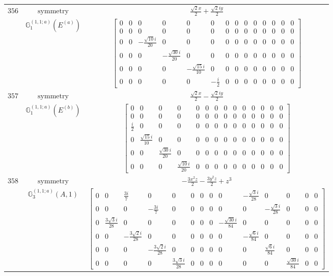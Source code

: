 \documentclass[fleqn,8pt,landscape]{jsarticle}
\begin{document}
\begin{longtable}{ccc}
$ 356 $ & $ \text{symmetry} $ & $ \frac{\sqrt{2} x}{2} + \frac{\sqrt{2} i y}{2} $ \\
$  $ & $ \mathbb{G}_{1}^{(1,1;a)}(E^{(a)}) $ & $ \begin{bmatrix} 0 & 0 & 0 & 0 & 0 & 0 & 0 & 0 & 0 & 0 & 0 & 0 & 0 & 0 \\ 0 & 0 & 0 & 0 & 0 & 0 & 0 & 0 & 0 & 0 & 0 & 0 & 0 & 0 \\ 0 & 0 & - \frac{\sqrt{10} i}{20} & 0 & 0 & 0 & 0 & 0 & 0 & 0 & 0 & 0 & 0 & 0 \\ 0 & 0 & 0 & - \frac{\sqrt{30} i}{20} & 0 & 0 & 0 & 0 & 0 & 0 & 0 & 0 & 0 & 0 \\ 0 & 0 & 0 & 0 & - \frac{\sqrt{15} i}{10} & 0 & 0 & 0 & 0 & 0 & 0 & 0 & 0 & 0 \\ 0 & 0 & 0 & 0 & 0 & - \frac{i}{2} & 0 & 0 & 0 & 0 & 0 & 0 & 0 & 0 \end{bmatrix} $ \\ \hline
$ 357 $ & $ \text{symmetry} $ & $ \frac{\sqrt{2} x}{2} - \frac{\sqrt{2} i y}{2} $ \\
$  $ & $ \mathbb{G}_{1}^{(1,1;a)}(E^{(b)}) $ & $ \begin{bmatrix} 0 & 0 & 0 & 0 & 0 & 0 & 0 & 0 & 0 & 0 & 0 & 0 & 0 & 0 \\ 0 & 0 & 0 & 0 & 0 & 0 & 0 & 0 & 0 & 0 & 0 & 0 & 0 & 0 \\ \frac{i}{2} & 0 & 0 & 0 & 0 & 0 & 0 & 0 & 0 & 0 & 0 & 0 & 0 & 0 \\ 0 & \frac{\sqrt{15} i}{10} & 0 & 0 & 0 & 0 & 0 & 0 & 0 & 0 & 0 & 0 & 0 & 0 \\ 0 & 0 & \frac{\sqrt{30} i}{20} & 0 & 0 & 0 & 0 & 0 & 0 & 0 & 0 & 0 & 0 & 0 \\ 0 & 0 & 0 & \frac{\sqrt{10} i}{20} & 0 & 0 & 0 & 0 & 0 & 0 & 0 & 0 & 0 & 0 \end{bmatrix} $ \\ \hline
$ 358 $ & $ \text{symmetry} $ & $ - \frac{3 x^{2} z}{2} - \frac{3 y^{2} z}{2} + z^{3} $ \\
$  $ & $ \mathbb{G}_{3}^{(1,1;a)}(A,1) $ & $ \begin{bmatrix} 0 & 0 & \frac{3 i}{7} & 0 & 0 & 0 & 0 & 0 & 0 & - \frac{\sqrt{3} i}{28} & 0 & 0 & 0 & 0 \\ 0 & 0 & 0 & - \frac{3 i}{7} & 0 & 0 & 0 & 0 & 0 & 0 & - \frac{\sqrt{3} i}{28} & 0 & 0 & 0 \\ 0 & \frac{3 \sqrt{3} i}{28} & 0 & 0 & 0 & 0 & 0 & 0 & - \frac{\sqrt{30} i}{84} & 0 & 0 & 0 & 0 & 0 \\ 0 & 0 & - \frac{3 \sqrt{2} i}{28} & 0 & 0 & 0 & 0 & 0 & 0 & - \frac{\sqrt{6} i}{84} & 0 & 0 & 0 & 0 \\ 0 & 0 & 0 & - \frac{3 \sqrt{2} i}{28} & 0 & 0 & 0 & 0 & 0 & 0 & \frac{\sqrt{6} i}{84} & 0 & 0 & 0 \\ 0 & 0 & 0 & 0 & \frac{3 \sqrt{3} i}{28} & 0 & 0 & 0 & 0 & 0 & 0 & \frac{\sqrt{30} i}{84} & 0 & 0 \end{bmatrix} $ \\ \hline

\end{longtable}
\end{document}
